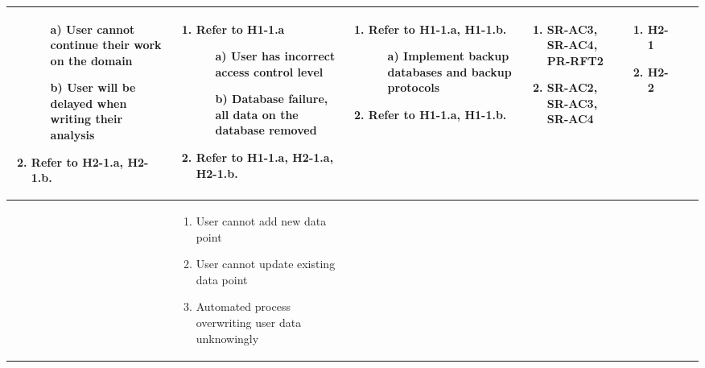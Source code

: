 \documentclass{article}
\begin{document}
\begin{landscape}
\begin{longtable}{|p{2cm}|p{4cm}|p{4cm}|p{4cm}|p{4cm}|p{2cm}|p{2cm}|}
\begin{enumerate}[leftmargin=*]
    \begin{enumerate}
        \item[a)] User cannot continue their work on the domain
        \item[b)] User will be delayed when writing their analysis
    \end{enumerate}
    \item Refer to H2-1.a, H2-1.b.
  \end{enumerate} &
  \begin{enumerate}[leftmargin=*]
    \item  Refer to H1-1.a
    \begin{enumerate}
        \item[a)] User has incorrect access control level
        \item[b)] Database failure, all data on the database removed
    \end{enumerate}
    \item Refer to H1-1.a, H2-1.a, H2-1.b.
  \end{enumerate} &
  \begin{enumerate}[leftmargin=*]
       \item Refer to H1-1.a, H1-1.b.
       \begin{enumerate}
        \item[a)] Implement backup databases and backup protocols
    \end{enumerate}
       \item  Refer to H1-1.a, H1-1.b.
  \end{enumerate} &
  \begin{enumerate}[leftmargin=*]
       \item SR-AC3, SR-AC4, PR-RFT2
       \item SR-AC2, SR-AC3, SR-AC4
  \end{enumerate} &
  \begin{enumerate}[leftmargin=*]
       \item H2-1
       \item H2-2
  \end{enumerate} \\
  \hline
   & 
  \begin{enumerate}[leftmargin=*]
      \item User cannot add new data point
      \item User cannot update existing data point
      \item Automated process overwriting user data unknowingly

\end{enumerate}
\end{longtable}
\end{landscape}
\end{document}
